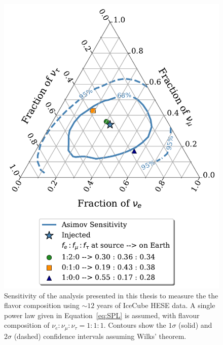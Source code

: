 \begin{figure}[h!]
    \caption{Sensitivity of the analysis presented in this thesis to measure the the flavor composition using $\sim12$ years of IceCube HESE data. A single power law given in Equation~\ref{eq:SPL} is assumed, with flavour composition of $\nu_e:\nu_{\mu}:\nu_{\tau}=1:1:1$. Contours show the $1\sigma$ (solid) and $2\sigma$ (dashed) confidence intervals assuming Wilks' theorem.}
    \includegraphics{./figures/Analysis/Asimov_Sensitivity.pdf}
\end{figure}

